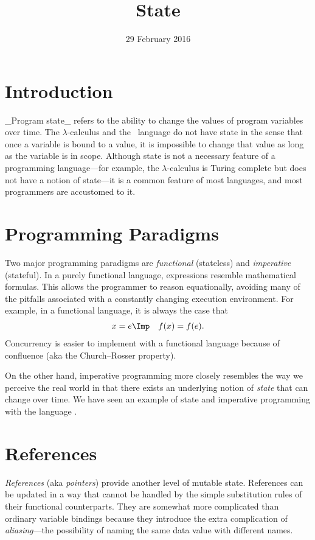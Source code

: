 \title{State}
\date{29 February 2016}
\maketitle

\section{Introduction}

_Program state_ refers to the ability to change the values of program variables over time.
The $\lambda$-calculus and the \FL\ language do not have state in the sense that once a variable
is bound to a value, it is impossible to change that value as long as the variable is in scope.
Although state is not a necessary feature of a programming language---for example,
the $\lambda$-calculus is Turing complete but does not have a notion of state---it is
a common feature of most languages, and most programmers are accustomed to it.

\section{Programming Paradigms}

Two major programming paradigms are \emph{functional} (stateless) and \emph{imperative} (stateful).
In a purely functional language, expressions resemble mathematical formulas.  This allows the programmer to
reason equationally, avoiding many of the pitfalls associated with
a constantly changing execution environment.  For example, in a functional
language, it is always the case that
\begin{eqnarray*}
x = e &\Imp& f(x) = f(e).
\end{eqnarray*}
Concurrency is easier to implement with a functional language because
of confluence (aka the Church--Rosser property).

On the other hand, imperative programming more closely resembles the way we perceive the real
world in that there exists an underlying notion of \emph{state} that can change
over time.  We have seen an example of state and imperative programming with
the language \IMP.

\section{References}

\emph{References} (aka \emph{pointers}) provide another
level of mutable state.  References can be updated in a way that cannot be handled by the
simple substitution rules of their functional counterparts.  They are somewhat more
complicated than ordinary variable bindings because they introduce the extra complication
of \emph{aliasing}---the possibility of naming the same data value with different names.

